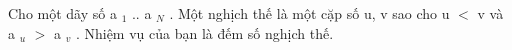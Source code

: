 Cho một dãy số a   $_    1   $   .. a   $_    N   $   . Một nghịch thế là một cặp số u, v sao cho u $<$ v và a   $_    u   $   $>$ a   $_    v   $   . Nhiệm vụ của bạn là đếm số nghịch thế.